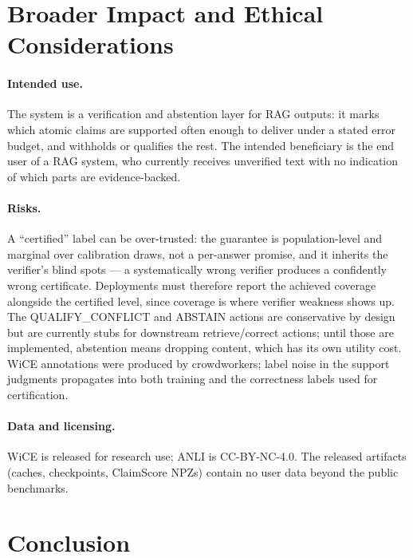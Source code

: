\documentclass{article}
\begin{document}
\section{Broader Impact and Ethical Considerations}
\label{sec:impact}

\paragraph{Intended use.}
The system is a verification and abstention layer for RAG outputs: it
marks which atomic claims are supported often enough to deliver under
a stated error budget, and withholds or qualifies the rest. The
intended beneficiary is the end user of a RAG system, who currently
receives unverified text with no indication of which parts are
evidence-backed.

\paragraph{Risks.}
A ``certified'' label can be over-trusted: the guarantee is
population-level and marginal over calibration draws, not a per-answer
promise, and it inherits the verifier's blind spots --- a systematically
wrong verifier produces a confidently wrong certificate. Deployments
must therefore report the achieved coverage alongside the certified
level, since coverage is where verifier weakness shows up. The
QUALIFY\_CONFLICT and ABSTAIN actions are conservative by design but
are currently stubs for downstream retrieve/correct actions; until
those are implemented, abstention means dropping content, which has its
own utility cost. WiCE annotations were produced by crowdworkers;
label noise in the support judgments propagates into both training and
the correctness labels used for certification.

\paragraph{Data and licensing.}
WiCE is released for research use; ANLI is CC-BY-NC-4.0. The released
artifacts (caches, checkpoints, ClaimScore NPZs) contain no user data
beyond the public benchmarks.

\section{Conclusion}
\label{sec:conclusion}
\end{document}
